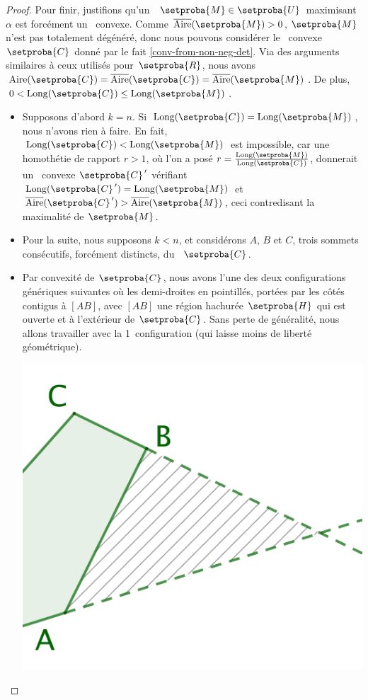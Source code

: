 \begin{proof}
    
    Pour finir, justifions qu'un \ncycle\ $\setproba{M} \in \setproba{U}$ maximisant $\alpha$ est forcément un \ngone\ convexe. 
    Comme $\sarea{\setproba{M}} > 0$, $\setproba{M}$ n'est pas totalement dégénéré,
    donc nous pouvons considérer le \kgone\ convexe $\setproba{C}$ donné par le fait \ref{conv-from-non-neg-det}.
    Via des arguments similaires à ceux utilisés pour $\setproba{R}$, 
    nous avons $\area{\setproba{C}} = \sarea{\setproba{C}} = \sarea{\setproba{M}}$.
    De plus,
    $0 < \cyclelen{\setproba{C}} \leq \cyclelen{\setproba{M}}$.
    \begin{itemize}
		\item Supposons d'abord $k = n$.
		Si $\cyclelen{\setproba{C}} = \cyclelen{\setproba{M}}$, nous n'avons rien à faire.
		En fait, $\cyclelen{\setproba{C}} < \cyclelen{\setproba{M}}$ est impossible, 
		car une homothétie de rapport $r > 1$, où l'on a posé $r = \frac{ \cyclelen{\setproba{M}} }{ \cyclelen{\setproba{C}} }$, donnerait un \ngone\ convexe $\primeit{\setproba{C}}$ vérifiant
		$\cyclelen{\primeit{\setproba{C}}} = \cyclelen{\setproba{M}}$
		et
		$\sarea{\primeit{\setproba{C}}} > \sarea{\setproba{M}}$, ceci contredisant la maximalité de $\setproba{M}$.


		\item Pour la suite, nous supposons $k < n$, et considérons $A$, $B$ et $C$, trois sommets consécutifs, forcément distincts, du \kgone\ $\setproba{C}$. 


		\item Par convexité de $\setproba{C}$, nous avons l'une des deux configurations génériques suivantes où les demi-droites en pointillés, portées par les côtés contigus à $[AB]$,  avec $[AB]$ une région hachurée $\setproba{H}$ qui est ouverte et à l'extérieur de $\setproba{C}$. 
		Sans perte de généralité, nous allons travailler avec la 1\iere\ configuration (qui laisse moins de liberté géométrique).
		\begin{multicols}{2}
			\centering

			\includegraphics[scale=.35]{content/polygon/at-least-one/add-vertex-1.png}


\end{multicols}
\end{itemize}
\end{proof}
